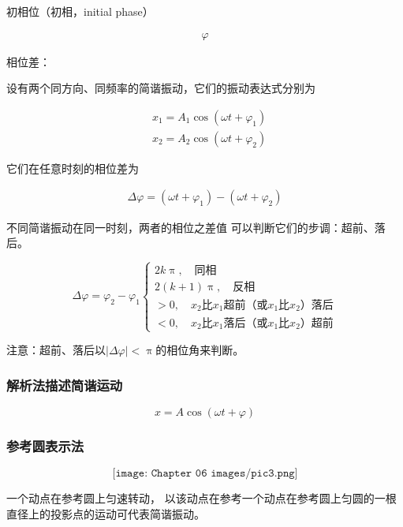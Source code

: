 \documentclass[
	12pt, %
	a4paper, %
]{myLegrandOrangeBook}
\begin{document}
    初相位（初相，initial phase）

    \begin{align}
        \varphi
    \end{align}

    相位差：

    设有两个同方向、同频率的简谐振动，它们的振动表达式分别为
    
    $$
        \begin{aligned}
            & x_1=A_1 \cos \left(\omega t+\varphi_1\right) \\
            & x_2=A_2 \cos \left(\omega t+\varphi_2\right)
        \end{aligned}
    $$

    它们在任意时刻的相位差为

    \begin{align}
        \Delta \varphi = \left(\omega t+\varphi_1\right) - \left(\omega t+\varphi_2\right)
    \end{align}

    不同简谐振动在同一时刻，两者的相位之差值
    可以判断它们的步调：超前、落后。

    $$
    \Delta \varphi=\varphi_2-\varphi_1\left\{\begin{array}{l}
        2 k \uppi, \quad \text{同相} \\
        2(k+1) \uppi, \quad \text{反相} \\
        >0, \quad \text{\(x_2\)比\(x_1\)超前（或\(x_1\)比\(x_2\)）落后} \\
        < 0, \quad \text{\(x_2\)比\(x_1\)落后（或\(x_1\)比\(x_2\)）超前}
        \end{array}\right.
    $$

    注意：超前、落后以\(\left|\Delta \varphi\right| < \uppi\)的相位角来判断。

\subsubsection{解析法描述简谐运动}

    \[
        x = A \cos \left(\omega t + \varphi\right)
    \]

\subsubsection{参考圆表示法}

    \[
        \texttt{[image: Chapter 06 images/pic3.png]}
    \]

    一个动点在参考圆上匀速转动，
    以该动点在参考一个动点在参考圆上匀圆的一根直径上的投影点的运动可代表简谐振动。
\end{document}
